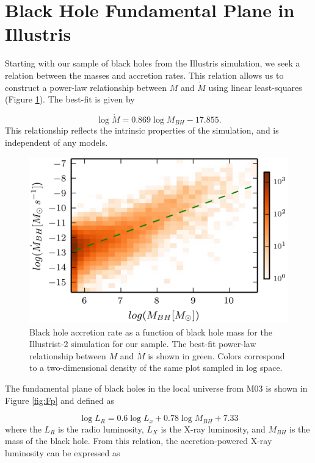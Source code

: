 \section{Black Hole Fundamental Plane in Illustris}

\label{sec:analysis}Starting with our sample of black holes from
the Illustris simulation, we seek a relation between the masses and
accretion rates. This relation allows us to construct a power-law
relationship between $M$ and $\dot{M}$ using linear least-squares
(Figure \ref{fig:bhpop_hist2d}). The best-fit is given by

\begin{equation}
\log\dot{M}=0.869\log M_{BH}-17.855.\label{eq:int_relation}
\end{equation}
This relationship reflects the intrinsic properties of the simulation,
and is independent of any models.
\begin{figure}
\centering{}\includegraphics[clip]{Figures/Illustris2_bhpop_hist2d}
\protect\caption{\label{fig:bhpop_hist2d}Black hole accretion rate as a function of
black hole mass for the Illustrist-2 simulation for our sample. The
best-fit power-law relationship between $M$ and $\dot{M}$ is shown
in green. Colors correspond to a two-dimensional density of the same
plot sampled in log space.}
\end{figure}


The fundamental plane of black holes in the local universe from M03
is shown in Figure \ref{fig:Fp} and defined as

\begin{equation}
\log L_{R}=0.6\log L_{x}+0.78\log M_{BH}+7.33
\end{equation}
where the $L_{R}$ is the radio luminosity, $L_{X}$ is the X-ray
luminosity, and $M_{BH}$ is the mass of the black hole. From this
relation, the accretion-powered X-ray luminosity can be expressed
as

